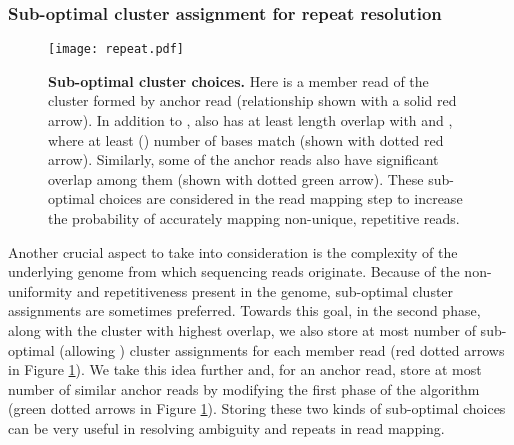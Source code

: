 \documentclass[a4paper]{article}
\begin{document}
\subsubsection{Sub-optimal cluster assignment for repeat resolution}
\begin{figure}
\centering
\texttt{[image: repeat.pdf]}
\caption{\label{fig:repeat}
{\bf Sub-optimal cluster choices.}
Here  is a member read of the cluster formed by anchor read 
  (relationship shown with a solid red arrow).
  In addition to ,  also has at least  length overlap with
   and , where at least () number of bases match
  (shown with dotted red arrow).
  Similarly, some of the anchor reads also have significant overlap
  among them (shown with dotted green arrow). These sub-optimal choices
  are considered in the read mapping step to increase the probability of
  accurately mapping non-unique, repetitive reads.
}
\vspace{-4mm}
\end{figure}
Another crucial aspect to take into consideration is the complexity of
the underlying genome from which sequencing reads originate. Because
of the non-uniformity and repetitiveness present in the genome,
sub-optimal cluster assignments are sometimes preferred. Towards this goal,
in the second phase, along with the cluster with highest overlap, we also
store at most  number of sub-optimal (allowing )
cluster assignments for each member read (red dotted arrows in Figure \ref{fig:repeat}).
We take this idea further and, for an anchor read, store at most
 number of similar anchor reads by modifying the first phase of the
algorithm (green dotted arrows in Figure \ref{fig:repeat}).
Storing these two kinds of sub-optimal choices
can be very useful in resolving ambiguity and repeats in read mapping.
\end{document}
